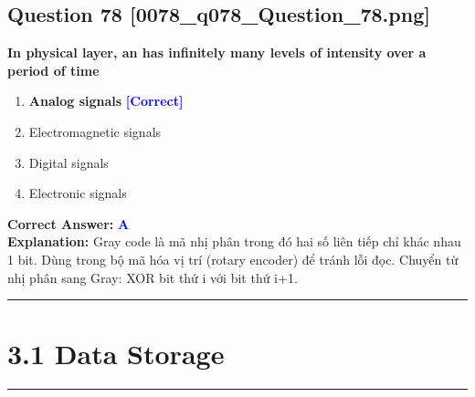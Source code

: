 \documentclass[11pt,a4paper]{article}
\begin{document}
\begin{minipage}{\textwidth}
\subsection*{Question 78 \quad \footnotesize{[0078\_q078\_Question\_78.png]}}
\noindent \textbf{In physical layer, an has infinitely many levels of intensity over a period of time}

\begin{enumerate}[label=\Alph*.]
    \item \textbf{Analog signals} \hfill \textcolor{blue}{\textbf{[Correct]}}
    \item Electromagnetic signals
    \item Digital signals
    \item Electronic signals
\end{enumerate}

\noindent \textbf{Correct Answer:} \textcolor{blue}{\textbf{A}} \\[2pt]
\noindent \textbf{Explanation:} Gray code là mã nhị phân trong đó hai số liên tiếp chỉ khác nhau 1 bit. Dùng trong bộ mã hóa vị trí (rotary encoder) để tránh lỗi đọc. Chuyển từ nhị phân sang Gray: XOR bit thứ i với bit thứ i+1.

\par\vspace{0.3cm}
\hrule
\vspace{0.3cm}
\end{minipage}


\newpage
\section*{3.1 Data Storage}
\hrule\vspace{0.5cm}
\end{document}
